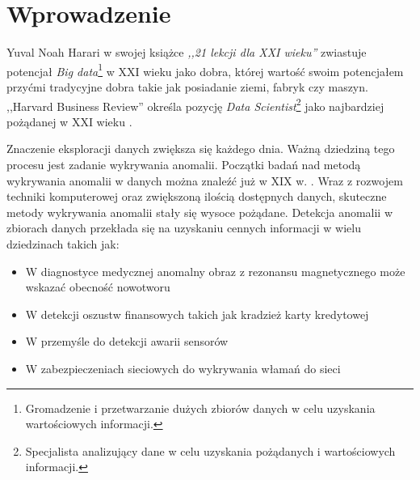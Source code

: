 \section{Wprowadzenie}
\label{sec:wprowadzenie}

Yuval Noah Harari w swojej książce \textit{,,21 lekcji dla XXI wieku''} zwiastuje potencjał \textit{Big data}\footnote{Gromadzenie i przetwarzanie dużych zbiorów danych w celu uzyskania wartościowych informacji.} w XXI wieku jako dobra, której wartość swoim potencjałem przyćmi tradycyjne dobra takie jak posiadanie ziemi, fabryk czy maszyn.
,,Harvard Business Review'' określa pozycję \textit{Data Scientist}\footnote{Specjalista analizujący dane w celu uzyskania pożądanych i wartościowych informacji.} jako najbardziej pożądanej w XXI wieku \cite{davenport2012data}. 

Znaczenie eksploracji danych zwiększa się każdego dnia.
Ważną dziedziną tego procesu jest zadanie wykrywania anomalii. Początki badań nad metodą wykrywania anomalii w danych można znaleźć już w XIX w. \cite{edgeworth1887xli}. 
Wraz z rozwojem techniki komputerowej oraz zwiększoną ilością dostępnych danych, skuteczne metody wykrywania anomalii stały się wysoce pożądane. 
Detekcja anomalii w zbiorach danych przekłada się na uzyskaniu cennych informacji w wielu dziedzinach takich jak:
\begin{itemize}
    \item W diagnostyce medycznej anomalny obraz z rezonansu magnetycznego może wskazać obecność nowotworu \cite{spence2001detection}
    \item W detekcji oszustw finansowych takich jak kradzież karty kredytowej \cite{bolton2001unsupervised}
    \item W przemyśle do detekcji awarii sensorów \cite{dereszynski2011spatiotemporal} 
    \item W zabezpieczeniach sieciowych do wykrywania włamań do sieci \cite{garcia2009anomaly}
\end{itemize} 

